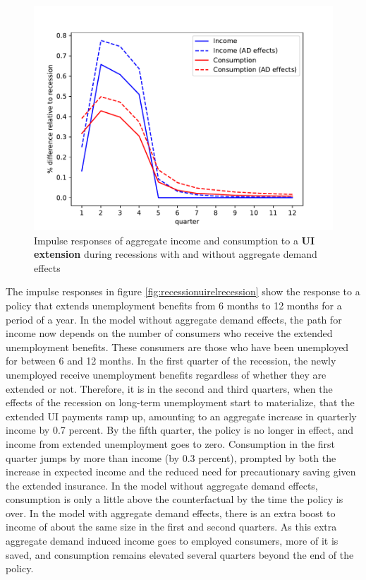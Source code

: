 \documentclass[\econtexRoot/HAFiscal]{subfiles}
\begin{document}
\begin{figure}
  \centering
  \includegraphics[width=0.8\linewidth]{Code/HA-Models/FromPandemicCode/Figures/recession_UI_relrecession}
  \caption{Impulse responses of aggregate income and consumption to a \textbf{UI extension} during recessions with and without aggregate demand effects}
  \notinsubfile{\label{fig:recessionuirelrecession}}
\end{figure}

The impulse responses in figure \ref{fig:recessionuirelrecession} show the response to a policy that extends unemployment benefits from 6 months to 12 months for a period of a year. In the model without aggregate demand effects, the path for income now depends on the number of consumers who receive the extended unemployment benefits. These consumers are those who have been unemployed for between 6 and 12 months. In the first quarter of the recession, the newly unemployed receive unemployment benefits regardless of whether they are extended or not. Therefore, it is in the second and third quarters, when the effects of the recession on long-term unemployment start to materialize, that the extended UI payments ramp up, amounting to an aggregate increase in quarterly income by 0.7 percent. By the fifth quarter, the policy is no longer in effect, and income from extended unemployment goes to zero. Consumption in the first quarter jumps by more than income (by 0.3 percent), prompted by both the increase in expected income and the reduced need for precautionary saving given the extended insurance. In the model without aggregate demand effects, consumption is only a little above the counterfactual by the time the policy is over. In the model with aggregate demand effects, there is an extra boost to income of about the same size in the first and second quarters. As this extra aggregate demand induced income goes to employed consumers, more of it is saved, and consumption remains elevated several quarters beyond the end of the policy.
\end{document}
